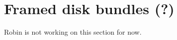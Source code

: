 \documentclass[11pt]{article}
\theoremstyle{definition}
\newtheorem{dfn}[thm]{Definition}
\theoremstyle{remark}
\def\mr#1{{\mathring{#1}}}
\def\Z{\mathbb{Z}}
\def\R{\mathbb{R}}
\def\D{\mathbb{D}}
\def\cA{\mathcal{A}}
\def\cD{\mathcal{D}}
\def\tn#1{\textnormal{#1}}
\begin{document}
\setlength{\parskip}{\baselineskip}
\setlength{\parindent}{0cm}

\section{Framed disk bundles (?)}

Robin is not working on this section for now.

%
%
%
\end{document}
